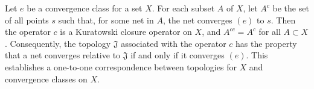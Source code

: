 Let $e$ be a convergence class for a set $X$. For each subset $A$ of $X$, let $A^c$ be the set of all points $s$ such that, for some net in $A$, the net converges $(e)$ to $s$. Then the operator $c$ is a Kuratowski closure operator on $X$, and $A^{cc} = A^c$ for all $A \subset X$. Consequently, the topology $\mathfrak{J}$ associated with the operator $c$ has the property that a net converges relative to $\mathfrak{J}$ if and only if it converges $(e)$. This establishes a one-to-one correspondence between topologies for $X$ and convergence classes on $X$.
